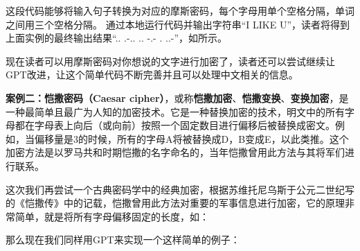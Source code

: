 这段代码能够将输入句子转换为对应的摩斯密码，每个字母用单个空格分隔，单词之间用三个空格分隔。
通过本地运行代码并输出字符串``I LIKE U''，读者将得到上面实例的最终输出结果``.. .-.. .. -.- . ..-''，如所示。


现在读者可以用摩斯密码对你想说的文字进行加密了，读者还可以尝试继续让GPT改进，让这个简单代码不断完善并且可以处理中文相关的信息。

\textbf{案例二：恺撒密码（Caesar cipher）}，或称\textbf{恺撒加密}、\textbf{恺撒变换}、\textbf{变换加密}，是一种最简单且最广为人知的加密技术。它是一种替换加密的技术，明文中的所有字母都在字母表上向后（或向前）按照一个固定数目进行偏移后被替换成密文。例如，当偏移量是3的时候，所有的字母A将被替换成D，B变成E，以此类推。这个加密方法是以罗马共和时期恺撒的名字命名的，当年恺撒曾用此方法与其将军们进行联系。

这次我们再尝试一个古典密码学中的经典加密，根据苏维托尼乌斯于公元二世纪写的《恺撒传》中的记载，恺撒曾用此方法对重要的军事信息进行加密，它的原理非常简单，就是将所有字母偏移固定的长度，如：


那么现在我们同样用GPT来实现一个这样简单的例子：



